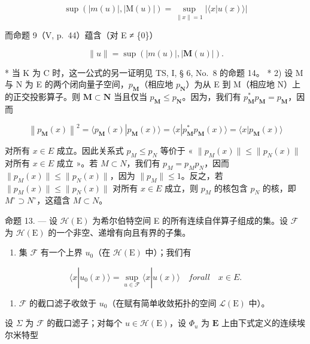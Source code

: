 \[
\sup \left(| m (u) |, | \mathrm{M} (u) |\right) = \sup _ {\| x \| = 1} \left| \langle x | u (x) \rangle \right|
\]

而命题 9（V, p.~44）蕴含（对 E ≠ \{0\}）

\[
\| u \| = \sup \left(| m (u) |, | \mathbf {M} (u) |\right).\tag{17}
\]

* 当 K 为 C 时，这一公式的另一证明见 TS, I, § 6, No.~8 的命题 14。 * 2) 设 M 与 N 为 E 的两个闭向量子空间，\(p_{\mathbf{M}}\)（相应地 \(p_{\mathbf{N}}\)）为从 E 到 M（相应地 N）上的正交投影算子。则 \(\mathbf{M} \subset \mathbf{N}\) 当且仅当 \(p_{\mathbf{M}} \leqslant p_{\mathbf{N}}\)。因为，我们有 \(p_{\mathbf{M}}^{*}p_{\mathbf{M}} = p_{\mathbf{M}}\)，因而

\[
\left\| p _ {\mathbf {M}} (x) \right\| ^ {2} = \langle p _ {\mathbf {M}} (x) | p _ {\mathbf {M}} (x) \rangle = \langle x | p _ {\mathbf {M}} ^ {*} p _ {\mathbf {M}} (x) \rangle = \langle x | p _ {\mathbf {M}} (x) \rangle
\]

对所有 \(x \in E\) 成立。因此关系式 \(p_{M} \leqslant p_{N}\) 等价于 « \(\|p_{M}(x)\| \leqslant \|p_{N}(x)\|\) 对所有 \(x \in E\) 成立 »。若 \(M \subset N\)，我们有 \(p_{M} = p_{M} p_{N}\)，因而 \(\|p_{M}(x)\| \leqslant \|p_{N}(x)\|\)，因为 \(\|p_{M}\| \leqslant 1\)。反之，若 \(\|p_{M}(x)\| \leqslant \|p_{N}(x)\|\) 对所有 \(x \in E\) 成立，则 \(p_{M}\) 的核包含 \(p_{N}\) 的核，即 \(M^{\circ} \supset N^{\circ}\)，这蕴含 \(M \subset N\)。

命题 13. --- 设 \(\mathcal{H}(\mathrm{E})\) 为希尔伯特空间 E 的所有连续自伴算子组成的集。设 \(\mathcal{F}\) 为 \(\mathcal{H}(\mathrm{E})\) 的一个非空、递增有向且有界的子集。

\begin{enumerate}
\def\labelenumi{(\roman{enumi})}
\tightlist
\item
  集 \(\mathcal{F}\) 有一个上界 \(u_0\)（在 \(\mathcal{H}(\mathrm{E})\) 中）；我们有
\end{enumerate}

\[
\langle x | u _ {0} (x) \rangle = \sup _ {u \in \mathcal {F}} \langle x | u (x) \rangle \quad f o r a l l \quad x \in E.\tag{18}
\]

\begin{enumerate}
\def\labelenumi{(\roman{enumi})}
\setcounter{enumi}{1}
\tightlist
\item
  \(\mathcal{F}\) 的截口滤子收敛于 \(u_0\)（在赋有简单收敛拓扑的空间 \(\mathcal{L}(\mathrm{E})\) 中）。
\end{enumerate}

设 \(\Sigma\) 为 \(\mathcal{F}\) 的截口滤子；对每个 \(u \in \mathcal{H}(\mathrm{E})\)，设 \(\Phi_u\) 为 \(\mathbf{E}\) 上由下式定义的连续埃尔米特型

